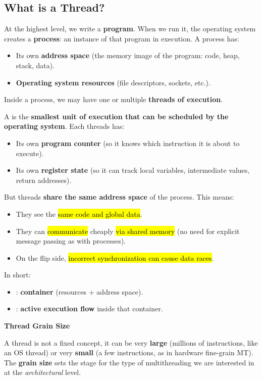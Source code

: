 \subsection{What is a Thread?}

At the highest level, we write a \textbf{program}. When we run it, the operating system creates a \textbf{process}: an instance of that program in execution. A process has:
\begin{itemize}
    \item Its own \textbf{address space} (the memory image of the program: code, heap, stack, data).
    \item \textbf{Operating system resources} (file descriptors, sockets, etc.).
\end{itemize}
Inside a process, we may have one or multiple \textbf{threads of execution}.

\highspace
A  is the \textbf{smallest unit of execution that can be scheduled by the operating system}. Each threads has:
\begin{itemize}
    \item Its own \textbf{program counter} (so it knows which instruction it is about to execute).
    \item Its own \textbf{register state} (so it can track local variables, intermediate values, return addresses).
\end{itemize}
But threads \textbf{share the same address space} of the process. This means:
\begin{itemize}
    \item They see the \hl{same code and global data}.
    \item They can \hl{communicate} cheaply \hl{via shared memory} (no need for explicit message passing as with processes).
    \item On the flip side, \hl{incorrect synchronization can cause data races}.
\end{itemize}
In short:
\begin{itemize}
    \item {}: \textbf{container} (resources $+$ address space).
    \item {}: \textbf{active execution flow} inside that container.
\end{itemize}

\highspace
\begin{flushleft}
    \textcolor{Green3}{ \textbf{Thread Grain Size}}
\end{flushleft}
A thread is not a fixed concept, it can be very \textbf{large} (millions of instructions, like an OS thread) or very \textbf{small} (a few instructions, as in hardware fine-grain MT). The \textbf{grain size} sets the stage for the type of multithreading we are interested in at the \emph{architectural} level.

